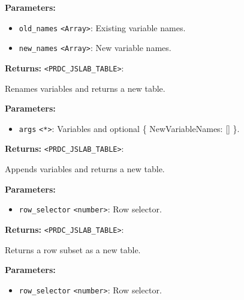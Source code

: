 \documentclass[12pt,a4paper]{article}
\begin{document}
\noindent \textbf{Parameters:}
\begin{itemize}
  \item \texttt{old\_names} \texttt{<Array>}: Existing variable names.
  \item \texttt{new\_names} \texttt{<Array>}: New variable names.
\end{itemize}

\noindent \textbf{Returns:} \texttt{<PRDC\_JSLAB\_TABLE>}:

\noindent Renames variables and returns a new table.

\vspace{5mm}
\noindent {}


\noindent \textbf{Parameters:}
\begin{itemize}
  \item \texttt{args} \texttt{<*>}: Variables and optional \{ NewVariableNames: [] \}.
\end{itemize}

\noindent \textbf{Returns:} \texttt{<PRDC\_JSLAB\_TABLE>}:

\noindent Appends variables and returns a new table.

\vspace{5mm}
\noindent {}


\noindent \textbf{Parameters:}
\begin{itemize}
  \item \texttt{row\_selector} \texttt{<number>}: Row selector.
\end{itemize}

\noindent \textbf{Returns:} \texttt{<PRDC\_JSLAB\_TABLE>}:

\noindent Returns a row subset as a new table.

\vspace{5mm}
\noindent {}


\noindent \textbf{Parameters:}
\begin{itemize}
  \item \texttt{row\_selector} \texttt{<number>}: Row selector.
\end{itemize}
\end{document}
